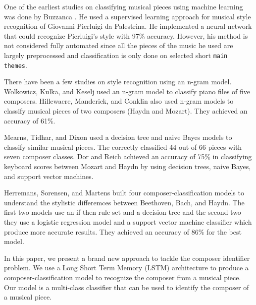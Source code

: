 \documentclass[11pt,a4paper]{article}
\begin{document}
One of the earliest studies on classifying musical pieces using machine learning was done by Buzzanca \cite{Buzz}. He used a supervised learning approach for musical style recognition of Giovanni Pierluigi da Palestrina. He implemented a neural network that could recognize Pierluigi's style with 97\% accuracy. However, his method is not considered fully automated since all the pieces of the music he used are largely preprocessed and classification is only done on selected short \texttt {main themes}.

There have been a few studies on style recognition using an n-gram model. Wolkowicz, Kulka, and Keselj \cite{n-gram} used an n-gram model to classify piano files of five composers.  Hillewaere, Manderick, and Conklin \cite{Hillewaere} also used n-gram models to classify musical pieces of two composers (Haydn and Mozart). They achieved an accuracy of 61\%.

Mearns, Tidhar, and Dixon \cite{Mearns} used a decision tree and naive Bayes models to classify similar musical pieces. The correctly classified 44 out of 66 pieces with seven composer classes. Dor and Reich \cite{Dor} achieved an accuracy of 75\% in classifying keyboard scores between Mozart and Haydn by using decision trees, naive Bayes, and support vector machines.

Herremans, Sorensen, and Martens \cite {Herremans} built four composer-classification models to understand the stylistic differemces between Beethoven, Bach, and Haydn. The first two models use an if-then rule set and a decision tree and the second two they use a logistic regression model and a support vector machine classifier which produce more accurate results. They achieved an accuracy of 86\% for the best model. 

In this paper, we present a brand new approach to tackle the composer identifier problem. We use a Long Short Term Memory (LSTM) architecture to produce a composer-classification model to recognize the composer from a musical piece. Our model is a multi-class classifier that can be used to identify the composer of a musical piece. 
\end{document}
